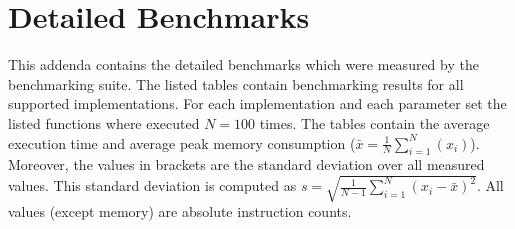 \section{Detailed Benchmarks}
\label{app:detailed_benchmarks}
This addenda contains the detailed benchmarks which were measured by the benchmarking suite. The listed tables contain benchmarking results for all supported implementations. For each implementation and each parameter set the listed functions where executed $N=100$ times. The tables contain the average execution time and average peak memory consumption ($\bar{x}=\frac{1}{N}\sum_{i=1}^N{(x_i)}$). Moreover, the values in brackets are the standard deviation over all measured values. This standard deviation is computed as $s=\sqrt{\frac{1}{N-1}\sum_{i=1}^N(x_i-\bar{x})^2}$. All values (except memory)  are absolute instruction counts.\newpage

